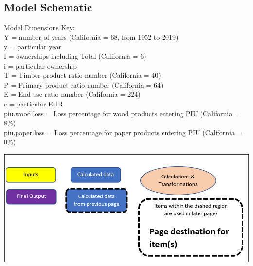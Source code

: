 \documentclass[
  openany]{book}
\begin{document}
\newpage

\hypertarget{model-func-schem}{%
\subsection{Model Schematic}\label{model-func-schem}}

Model Dimensions Key:\\
Y = number of years (California = 68, from 1952 to 2019)\\
y = particular year\\
I = ownerships including Total (California = 6)\\
i = particular ownership\\
T = Timber product ratio number (California = 40)\\
P = Primary product ratio number (California = 64)\\
E = End use ratio number (California = 224)\\
e = particular EUR\\
piu.wood.loss = Loss percentage for wood products entering PIU
(California = 8\%)\\
piu.paper.loss = Loss percentage for paper products entering PIU
(California = 0\%)

\includegraphics[width=1\linewidth]{images/schematic-0}

\newpage
\end{document}
